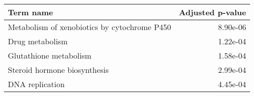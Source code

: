 \begin{tabular}{lr}
\toprule
                                    Term name &  Adjusted p-value \\
\midrule
 Metabolism of xenobiotics by cytochrome P450 &          8.90e-06 \\
                              Drug metabolism &          1.22e-04 \\
                       Glutathione metabolism &          1.58e-04 \\
                 Steroid hormone biosynthesis &          2.99e-04 \\
                              DNA replication &          4.45e-04 \\
\bottomrule
\end{tabular}
